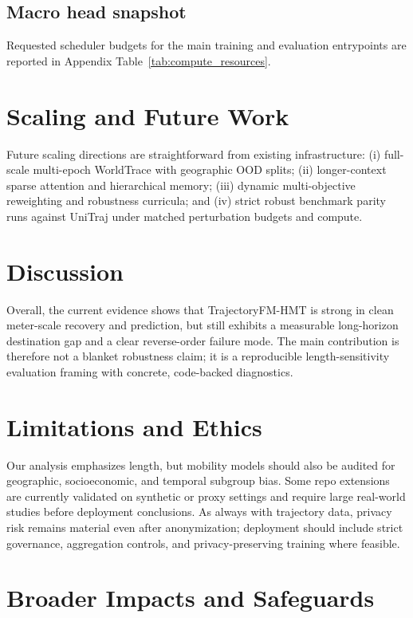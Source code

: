 \documentclass{article}
\begin{document}
\subsection{Macro head snapshot}



Requested scheduler budgets for the main training and evaluation entrypoints are reported in Appendix Table~\ref{tab:compute_resources}.

\section{Scaling and Future Work}
Future scaling directions are straightforward from existing infrastructure: (i) full-scale multi-epoch WorldTrace with geographic OOD splits; (ii) longer-context sparse attention and hierarchical memory; (iii) dynamic multi-objective reweighting and robustness curricula; and (iv) strict robust benchmark parity runs against UniTraj under matched perturbation budgets and compute.

\section{Discussion}
Overall, the current evidence shows that TrajectoryFM-HMT is strong in clean meter-scale recovery and prediction, but still exhibits a measurable long-horizon destination gap and a clear reverse-order failure mode. The main contribution is therefore not a blanket robustness claim; it is a reproducible length-sensitivity evaluation framing with concrete, code-backed diagnostics.

\section{Limitations and Ethics}
Our analysis emphasizes length, but mobility models should also be audited for geographic, socioeconomic, and temporal subgroup bias. Some repo extensions are currently validated on synthetic or proxy settings and require large real-world studies before deployment conclusions. As always with trajectory data, privacy risk remains material even after anonymization; deployment should include strict governance, aggregation controls, and privacy-preserving training where feasible.

\section{Broader Impacts and Safeguards}
\end{document}
